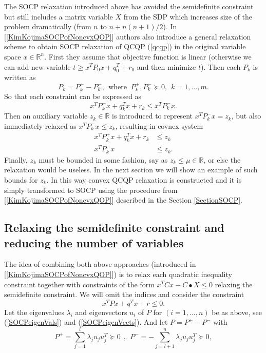 \documentclass[12pt]{book}
\theoremstyle{definition}
\begin{document}
The SOCP relaxation introduced above has avoided the semidefinite constraint but still includes a matrix variable $X$ from the SDP which increases size of the problem dramatically (from $n$ to $n+ n(n+1)/2$). In [\ref{KimKojimaSOCPofNoncvxQOP}] authors also introduce a general relaxation scheme to obtain SOCP relaxation of QCQP (\ref{qcqp}) in the original variable space $x\in \mathbb{R}^n$. First they assume that objective function is linear (otherwise we can add new variable $t\geq x^TP_0x + q_0^T + r_0$ and then minimize $t$). Then each $P_k$ is written as 
$$P_k=P_k^+ -P_k^-, \ \ \mbox{where } \ P_k^+, P_k^- \succeq 0, \ \ k=1,\dots ,m.$$ 
So that each constraint can be expressed as 
\begin{equation}
x^TP_k^+x + q_k^Tx + r_k \leq x^TP_k^-x.
\end{equation}
Then an auxiliary variable $z_k\in \mathbb{R}$ is introduced to represent $x^TP_k^-x = z_k$, but also immediately relaxed as $x^TP_k^-x \leq z_k$, resulting in covnex system
\begin{equation}
\begin{array}{rl}
x^TP_k^+x + q_k^Tx + r_k &\leq z_k  \\
x^TP_k^-x & \leq z_k.
\end{array} 
\end{equation}
Finally, $z_k$ must be bounded in some fashion, say as $z_k\leq \mu \in \mathbb{R}$, or else the relaxation would be useless. In the next section we will show an example of such bounds for $z_k$.
In this way convex QCQP relaxation is constructed and it is simply transformed to SOCP using the procedure from [\ref{KimKojimaSOCPofNoncvxQOP}] described in the Section \ref{SectionSOCP}. 




\subsection{Relaxing the semidefinite constraint and reducing the number of variables}
\label{SubsectionSOCPrelaxInOriginalVariable}

The idea of combining both above approaches (introduced in [\ref{KimKojimaSOCPofNoncvxQOP}]) is to relax each 
quadratic inequality constraint together with constraints of the form $x^TCx-C\bullet X \leq 0$ relaxing the semidefinite constraint. We will omit the indices and consider the constraint
\begin{equation}
\label{SOCPsingleQconst}
x^TPx + q^Tx + r\leq 0.
\end{equation}
Let the eigenvalues $\lambda_i$ and eigenvectors $u_i$ of $P$ for $(i = 1,\dots ,n)$ be as above, see (\ref{SOCPeigenVals}) and (\ref{SOCPeigenVects}). And let $ P = P^+ - P^-$ with 
\begin{equation}
P^+ = \sum_{j = 1}^{l}\lambda_j u_ju_j^T\succeq 0 \ \ , \ \ P^-  = -\sum_{j = l+1}^{n}\lambda_j u_ju_j^T\succeq 0,
\end{equation}
\end{document}
